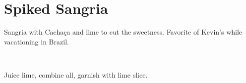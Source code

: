 \section[Spiked Sangria]{Spiked Sangria~}


\begin{recipestats}[
	servings=1,
	preptime=5~\minute,
	source=Kevin Green,
]
\end{recipestats}


\begin{recipeabstract}
	Sangria with Cacha\c{c}a and lime to cut the sweetness.
	Favorite of Kevin's while vacationing in Brazil.
\end{recipeabstract}


\begin{ingredientcolumns}
	\begin{ingredientblock}
		\\
	\end{ingredientblock}
	\begin{ingredientblock}
		\ingredient[1][wedge]{lime}
	\end{ingredientblock}
\end{ingredientcolumns}


\begin{preparation}
\item Juice lime, combine all, garnish with lime slice.
\end{preparation}


\recipeend%
